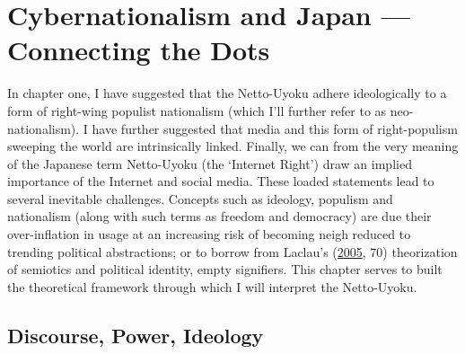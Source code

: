 \documentclass[10pt,british,A4paper,,openany]{memoir}
\begin{document}
\chapter{Cybernationalism and Japan --- Connecting the
Dots}\label{cybernationalism-and-japan-connecting-the-dots}

In chapter one, I have suggested that the Netto-Uyoku adhere
ideologically to a form of right-wing populist nationalism (which I'll
further refer to as neo-nationalism). I have further suggested that
media and this form of right-populism sweeping the world are
intrinsically linked. Finally, we can from the very meaning of the
Japanese term Netto-Uyoku (the `Internet Right') draw an implied
importance of the Internet and social media. These loaded statements
lead to several inevitable challenges. Concepts such as ideology,
populism and nationalism (along with such terms as freedom and
democracy) are due their over-inflation in usage at an increasing risk
of becoming neigh reduced to trending political abstractions; or to
borrow from Laclau's
(\protect\hyperlink{ref-laclau_populist_2005}{2005}, 70) theorization of
semiotics and political identity, empty signifiers. This chapter serves
to built the theoretical framework through which I will interpret the
Netto-Uyoku.

\section{Discourse, Power, Ideology}\label{discourse-power-ideology}
\end{document}
